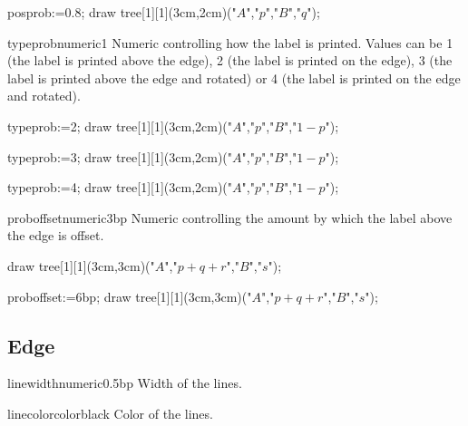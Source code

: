\documentclass[11pt,a4paper,english]{article}
\begin{document}
\begin{exemple}[lefthand ratio=0.65]
 posprob:=0.8;
 draw tree[1][1](3cm,2cm)("$A$","$p$","$B$","$q$");
\end{exemple}


\begin{mptparam}{typeprob}{numeric}{1}
Numeric controlling how the label is printed. Values can be 1 (the label is printed above the edge), 2 (the label is printed on the edge), 3 (the label is printed above the edge and rotated) or 4 (the label is printed on the edge and rotated).
\end{mptparam}

\begin{exemple}[lefthand ratio=0.7]
 typeprob:=2;
 draw tree[1][1](3cm,2cm)("$A$","$p$","$B$","$1-p$");
\end{exemple}

\begin{exemple}[lefthand ratio=0.7]
 typeprob:=3;
 draw tree[1][1](3cm,2cm)("$A$","$p$","$B$","$1-p$");
\end{exemple}

\begin{exemple}[lefthand ratio=0.7]
 typeprob:=4;
 draw tree[1][1](3cm,2cm)("$A$","$p$","$B$","$1-p$");
\end{exemple}



\begin{mptparam}{proboffset}{numeric}{3bp}
Numeric controlling the amount by which the label above the edge is offset.
\end{mptparam}

\begin{exemple}[lefthand ratio=0.75]
 draw tree[1][1](3cm,3cm)("$A$","$p+q+r$","$B$","$s$");
\end{exemple}



\begin{exemple}[lefthand ratio=0.75]
 proboffset:=6bp;
 draw tree[1][1](3cm,3cm)("$A$","$p+q+r$","$B$","$s$");
\end{exemple}


\subsection{Edge}
\begin{mptparam}{linewidth}{numeric}{0.5bp}
Width of the lines.
\end{mptparam}

\begin{mptparam}{linecolor}{color}{black}
Color of the lines.
\end{mptparam}
\end{document}
